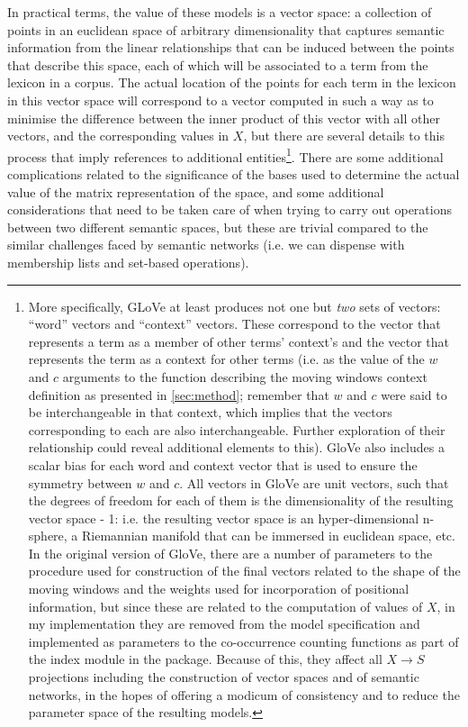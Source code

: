 In practical terms, the value of these models is a vector space: a collection of points in an euclidean space of arbitrary dimensionality that captures semantic information from the linear relationships that can be induced between the points that describe this space, each of which will be associated to a term from the lexicon in a corpus.
The actual location of the points for each term in the lexicon in this vector space will correspond to a vector computed in such a way as to minimise the difference between the inner product of this vector with all other vectors, and the corresponding values in $X$, but there are several details to this process that imply references to additional entities\footnote{
    More specifically, GLoVe at least produces not one but \emph{two} sets of vectors: ``word'' vectors and ``context'' vectors.
    These correspond to the vector that represents a term as a member of other terms' context's and the vector that represents the term as a context for other terms (i.e. as the value of the $w$ and $c$ arguments to the function describing the moving windows context definition as presented in \autoref{sec:method}; remember that $w$ and $c$ were said to be interchangeable in that context, which implies that the vectors corresponding to each are also interchangeable. Further exploration of their relationship could reveal additional elements to this).
    GloVe also includes a scalar bias for each word and context vector that is used to ensure the symmetry between $w$ and $c$.
    All vectors in GloVe are unit vectors, such that the degrees of freedom for each of them is the dimensionality of the resulting vector space - 1: i.e. the resulting vector space is an hyper-dimensional n-sphere, a Riemannian manifold that can be immersed in euclidean space, etc.
    In the original version of GloVe, there are a number of parameters to the procedure used for construction of the final vectors related to the shape of the moving windows and the weights used for incorporation of positional information, but since these are related to the computation of values of $X$, in my implementation they are removed from the model specification and implemented as parameters to the co-occurrence counting functions as part of the index module in the  package.
    Because of this, they affect all $X \rightarrow S$ projections including the construction of vector spaces and of semantic networks, in the hopes of offering a modicum of consistency and to reduce the parameter space of the resulting models.
}.
There are some additional complications related to the significance of the bases used to determine the actual value of the matrix representation of the space, and some additional considerations that need to be taken care of when trying to carry out operations between two different semantic spaces, but these are trivial compared to the similar challenges faced by semantic networks (i.e. we can dispense with membership lists and set-based operations).

